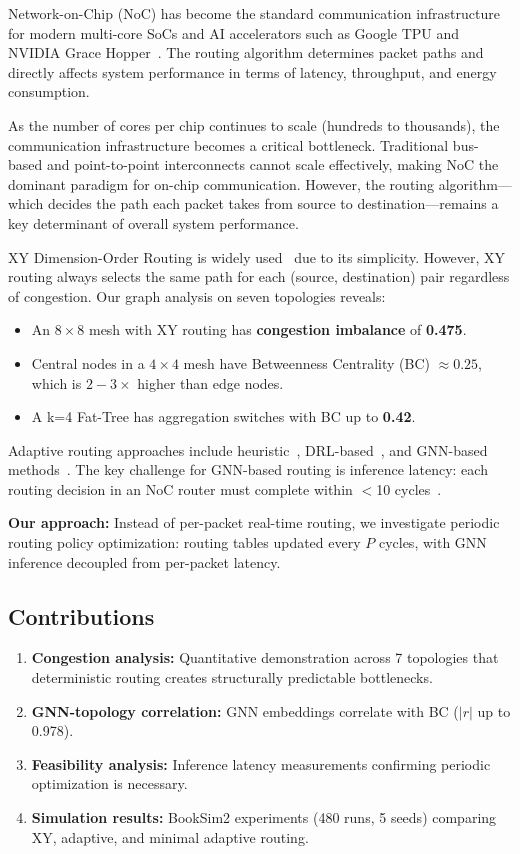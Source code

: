 \documentclass[conference]{IEEEtran}
\begin{document}
Network-on-Chip (NoC) has become the standard communication infrastructure for modern multi-core SoCs and AI accelerators such as Google TPU and NVIDIA Grace Hopper~\cite{mirhoseini2021}. The routing algorithm determines packet paths and directly affects system performance in terms of latency, throughput, and energy consumption.

As the number of cores per chip continues to scale (hundreds to thousands), the communication infrastructure becomes a critical bottleneck. Traditional bus-based and point-to-point interconnects cannot scale effectively, making NoC the dominant paradigm for on-chip communication. However, the routing algorithm---which decides the path each packet takes from source to destination---remains a key determinant of overall system performance.

XY Dimension-Order Routing is widely used~\cite{wang2022maar} due to its simplicity. However, XY routing always selects the same path for each (source, destination) pair regardless of congestion. Our graph analysis on seven topologies reveals:
\begin{itemize}
    \item An $8\times8$ mesh with XY routing has \textbf{congestion imbalance} of \textbf{0.475}.
    \item Central nodes in a $4\times4$ mesh have Betweenness Centrality (BC) $\approx 0.25$, which is $2-3\times$ higher than edge nodes.
    \item A k=4 Fat-Tree has aggregation switches with BC up to \textbf{0.42}.
\end{itemize}

Adaptive routing approaches include heuristic~\cite{dyad2004,ebrahimi2019}, DRL-based~\cite{wang2022maar,deepnr2022}, and GNN-based methods~\cite{g-routing2023,drl-gnn2019}. The key challenge for GNN-based routing is inference latency: each routing decision in an NoC router must complete within $<$10 cycles~\cite{wang2022maar}.

\textbf{Our approach:} Instead of per-packet real-time routing, we investigate periodic routing policy optimization: routing tables updated every $P$ cycles, with GNN inference decoupled from per-packet latency.

\subsection{Contributions}
\begin{enumerate}
    \item \textbf{Congestion analysis:} Quantitative demonstration across 7 topologies that deterministic routing creates structurally predictable bottlenecks.
    \item \textbf{GNN-topology correlation:} GNN embeddings correlate with BC ($|r|$ up to 0.978).
    \item \textbf{Feasibility analysis:} Inference latency measurements confirming periodic optimization is necessary.
    \item \textbf{Simulation results:} BookSim2 experiments (480 runs, 5 seeds) comparing XY, adaptive, and minimal adaptive routing.
\end{enumerate}
\end{document}
